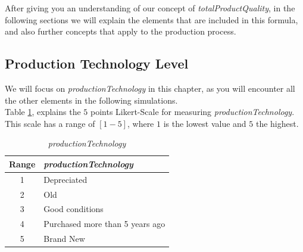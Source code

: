 After giving you an understanding of our concept of  \textit{totalProductQuality}, in the following sections we will explain the elements that  are included in this formula, and also further concepts that apply to the production process.

\subsection{Production Technology Level}
We will focus on \textit{productionTechnology} in this chapter, as you will encounter all the other elements in the following simulations. \\
Table \ref{table:my-label}, explains the $5$ points Likert-Scale for measuring \textit{productionTechnology}. This scale has a range of $[1-5]$, where $1$ is the lowest value and $5$ the highest.

\begin{table}[ht]
\centering
\begin{tabular}{|c|l|}
\hline
 Range & \textit{productionTechnology}\\
\hline
 1 & Depreciated  \\
 2 & Old \\
 3 & Good conditions \\
 4 & Purchased more than 5 years ago  \\
 5 & Brand New\\
\hline
\end{tabular}
\caption{\textit{productionTechnology}}
\label{table:my-label}
\end{table}

